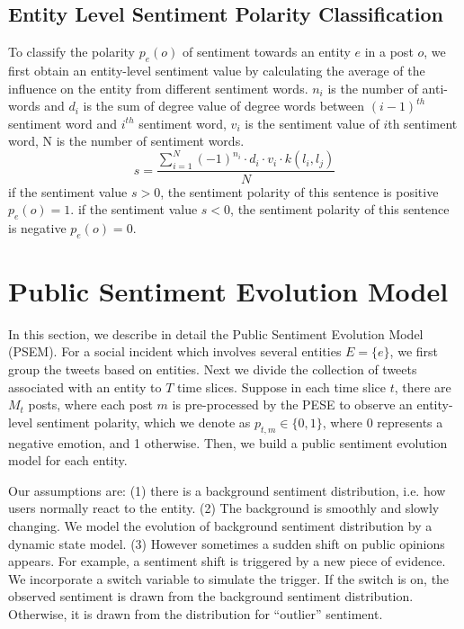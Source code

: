 \documentclass[runningheads]{llncs}
\begin{document}
\subsection{Entity Level Sentiment Polarity Classification}

To classify the polarity $p_e(o)$ of sentiment towards an entity $e$ in a post $o$, we first obtain an entity-level sentiment value by calculating the average of the influence  on the entity from different sentiment words. $n_i$ is the number of anti-words and $d_i$ is the sum of degree value of degree words between $(i-1)^{th}$ sentiment word and $i^{th}$ sentiment word, $v_i$ is the sentiment value of $i$th sentiment word, N is the number of sentiment words.
\begin{equation}\label{equ:entitysentiment}
s = \frac{\sum_{i=1}^{N}(-1)^{n_i}\cdot d_i\cdot v_i\cdot k(l_i,l_j)}{N}
\end{equation}
if the sentiment value $s>0$, the sentiment polarity of this sentence is positive $p_e(o)=1$. if the sentiment value $s<0$, the sentiment polarity of this sentence is negative $p_e(o)=0$. 


\section{Public Sentiment Evolution Model}\label{sec:public opinion model}

In this section, we describe in detail the Public Sentiment Evolution Model (PSEM). 
For a social incident which involves several entities $E=\{e\}$, we first group the tweets based on entities. 
Next we divide the collection of tweets associated with an entity to $T$ time slices. 
Suppose in each time slice $t$, there are $M_t$ posts, where each post $m$ is pre-processed by the PESE to observe an entity-level sentiment polarity, which we denote as $p_{t,m}\in \{0,1\}$, where 0 represents a negative emotion, and 1 otherwise. 
Then, we build a public sentiment evolution model for each entity.

Our assumptions are: (1) there is a background sentiment distribution, i.e. how users normally react to the entity. 
(2) The background is smoothly and slowly changing. We model the evolution of background sentiment distribution by a dynamic state model.
(3) However sometimes a sudden shift on public opinions appears. For example, a sentiment shift is triggered by a new piece of evidence. We incorporate a switch variable to simulate the trigger. If the switch is on, the observed sentiment is drawn from the background sentiment distribution. Otherwise, it is drawn from the distribution for ``outlier'' sentiment.
\end{document}
